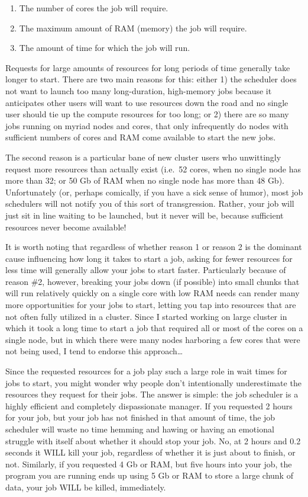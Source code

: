 \documentclass[]{krantz}
\providecommand{\tightlist}{%
  \setlength{\itemsep}{0pt}\setlength{\parskip}{0pt}}
\begin{document}
\begin{enumerate}
\def\labelenumi{\arabic{enumi}.}
\tightlist
\item
  The number of cores the job will require.
\item
  The maximum amount of RAM (memory) the job will require.
\item
  The amount of time for which the job will run.
\end{enumerate}

Requests for large amounts of resources for long periods of time generally take longer to start.
There are two main reasons for this: either 1) the scheduler does not want to launch too many
long-duration, high-memory jobs because it anticipates other users will want to use resources
down the road and no single user should tie up the compute resources
for too long; or 2) there are so many jobs running on myriad nodes and cores, that only
infrequently do nodes with sufficient numbers of cores and RAM come available to start
the new jobs.

The second reason is a particular bane of new cluster users who unwittingly request more resources
than actually exist (i.e.~52 cores, when no single node has more than 32; or 50 Gb of RAM when no single
node has more than 48 Gb). Unfortunately (or, perhaps comically, if you have a sick sense of
humor), most job schedulers will not notify you of this sort of transgression.
Rather, your job will just sit in line waiting to be launched, but it never will be, because sufficient
resources never become available!

It is worth noting that regardless of whether reason 1 or reason 2 is the dominant cause influencing
how long it takes to start a job, asking for fewer resources for less time will generally allow your
jobs to start faster. Particularly because of reason \#2, however, breaking your jobs down (if possible) into
small chunks that will run relatively quickly on a single core with low RAM needs can render many more
opportunities for your jobs to start, letting you tap into resources that are not often fully utilized
in a cluster. Since I started working on large cluster in which it took a long time to start a job
that required all or most of the cores on a single node, but in which there were many nodes
harboring a few cores that were not being used, I tend to endorse this approach\ldots{}

Since the requested resources for a job play such a large role in wait times for jobs to start,
you might wonder why people don't intentionally underestimate the resources they request for their
jobs. The answer is simple: the job scheduler is a highly efficient and completely dispassionate
manager. If you requested 2 hours for your job, but your job has not finished in that amount of time,
the job scheduler will waste no time hemming and hawing or having an emotional struggle with itself
about whether it should stop your job. No, at 2 hours and 0.2 seconds it WILL kill your job, regardless
of whether it is just about to finish, or not. Similarly, if you requested 4 Gb or RAM, but five hours into
your job, the program you are running ends up using 5 Gb or RAM to store a large chunk of data, your
job WILL be killed, immediately.
\end{document}
